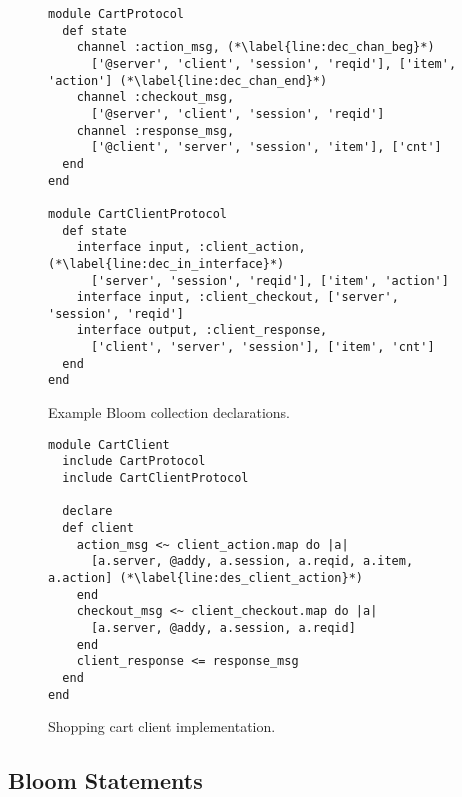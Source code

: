 \begin{figure}[t]
\begin{scriptsize}
\begin{lstlisting}
module CartProtocol
  def state
    channel :action_msg, (*\label{line:dec_chan_beg}*)
      ['@server', 'client', 'session', 'reqid'], ['item', 'action'] (*\label{line:dec_chan_end}*)
    channel :checkout_msg,
      ['@server', 'client', 'session', 'reqid']
    channel :response_msg,
      ['@client', 'server', 'session', 'item'], ['cnt']
  end
end

module CartClientProtocol
  def state
    interface input, :client_action, (*\label{line:dec_in_interface}*)
      ['server', 'session', 'reqid'], ['item', 'action'] 
    interface input, :client_checkout, ['server', 'session', 'reqid']
    interface output, :client_response, 
      ['client', 'server', 'session'], ['item', 'cnt']
  end
end
\end{lstlisting}
\vspace{-10pt}
\caption{Example Bloom collection declarations.}
\label{fig:declarations}
\end{scriptsize}
\vspace{-2pt}
\end{figure}

\begin{figure}[t]
\begin{scriptsize}
\begin{lstlisting}
module CartClient
  include CartProtocol
  include CartClientProtocol

  declare
  def client
    action_msg <~ client_action.map do |a| 
      [a.server, @addy, a.session, a.reqid, a.item, a.action] (*\label{line:des_client_action}*)
    end
    checkout_msg <~ client_checkout.map do |a| 
      [a.server, @addy, a.session, a.reqid]
    end
    client_response <= response_msg
  end
end
\end{lstlisting}
\vspace{-10pt}
\caption{Shopping cart client implementation.}
\label{fig:cart_client}
\end{scriptsize}
\vspace{-2pt}
\end{figure}


\subsection{Bloom Statements}

